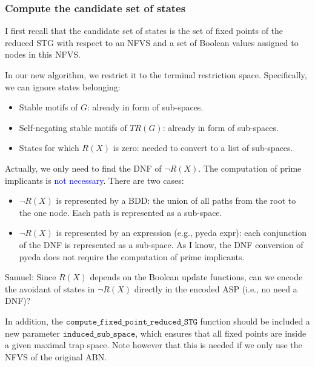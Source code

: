 \documentclass{beamer}              %
\newcommand{\blue}[1]{\textcolor{blue}{#1}}
\begin{document}
\begin{frame}[allowframebreaks]
\frametitle{Compute the candidate set of states}

I first recall that the candidate set of states is the set of fixed points of the reduced STG with respect to an NFVS and a set of Boolean values assigned to nodes in this NFVS.

\hspace{0cm}

In our new algorithm, we restrict it to the terminal restriction space.
Specifically, we can ignore states belonging:
\begin{itemize}
  \item Stable motifs of \(G\): already in form of sub-spaces.
  \item Self-negating stable motifs of \(TR(G)\): already in form of sub-spaces.
  \item States for which \(R(X)\) is zero: needed to convert to a list of sub-spaces.
\end{itemize}

\hspace{0cm}

Actually, we only need to find the DNF of \(\neg R(X)\).
The computation of prime implicants is \blue{not necessary}.
There are two cases:
\begin{itemize}
  \item \(\neg R(X)\) is represented by a BDD: the union of all paths from the root to the one node. Each path is represented as a sub-space.
  \item \(\neg R(X)\) is represented by an expression (e.g., pyeda expr): each conjunction of the DNF is represented as a sub-space. As I know, the DNF conversion of pyeda does not require the computation of prime implicants.
\end{itemize}

\hspace{0cm}

Samuel: Since \(R(X)\) depends on the Boolean update functions, can we encode the avoidant of states in \(\neg R(X)\) directly in the encoded ASP (i.e., no need a DNF)?

\hspace{0cm}

In addition, the \(\texttt{compute\_fixed\_point\_reduced\_STG}\) function should be included a new parameter \(\texttt{induced\_sub\_space}\), which ensures that all fixed points are inside a given maximal trap space.
Note however that this is needed if we only use the NFVS of the original ABN.

\end{frame}
\end{document}
